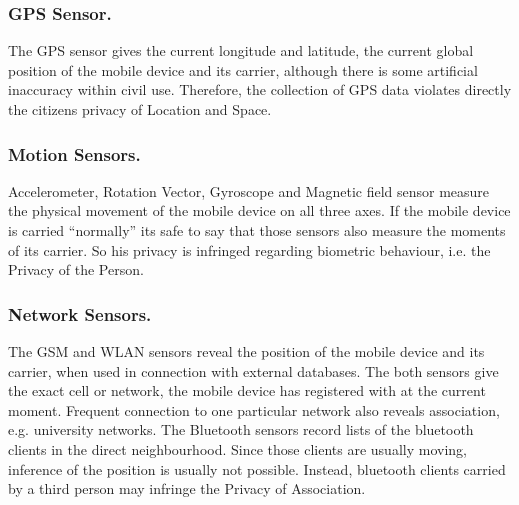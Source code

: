 \documentclass[runningheads,a4paper]{llncs}
\begin{document}
\subsubsection{GPS Sensor.}
The GPS sensor gives the current longitude and latitude, the current global position of the mobile device and its carrier, although there is some artificial inaccuracy within civil use. Therefore, the collection of GPS data violates directly the citizens privacy of Location and Space.


\subsubsection{Motion Sensors.}
Accelerometer, Rotation Vector, Gyroscope and Magnetic field sensor measure the physical movement of the mobile device on all three axes.
If the mobile device is carried ``normally'' its safe to say that those sensors also measure the moments of its carrier.
So his privacy is infringed regarding biometric behaviour, i.e. the Privacy of the Person.


\subsubsection{Network Sensors.}
The GSM and WLAN sensors reveal the position of the mobile device and its carrier, when used in connection with external databases.
The both sensors give the exact cell or network, the mobile device has registered with at the current moment.
Frequent connection to one particular network also reveals association, e.g. university networks. The Bluetooth sensors record lists of the bluetooth clients in the direct neighbourhood.
Since those clients are usually moving, inference of the position is usually not possible.
Instead, bluetooth clients carried by a third person may infringe the Privacy of Association.

\end{document}
